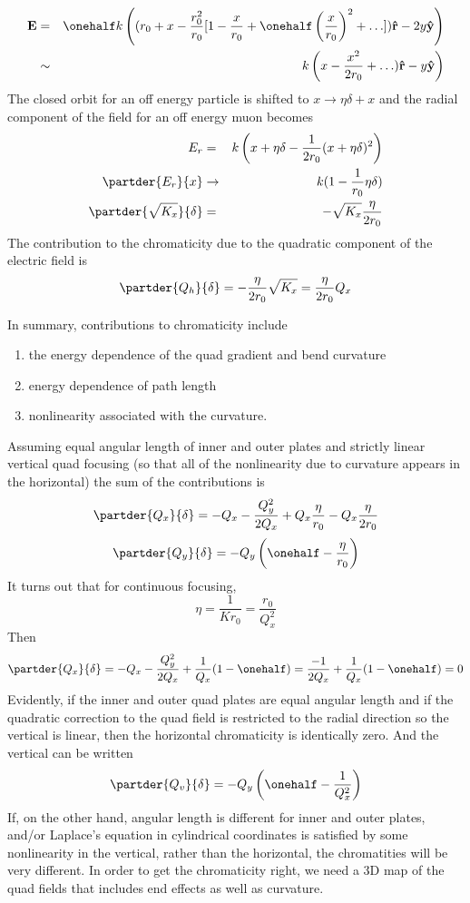 \begin{enumerate}
\begin{eqnarray*}
{\bf E} &=& \onehalf k\left((r_0+x-\frac{r_0^2}{r_0}[1-\frac{x}{r_0}+\onehalf \left(\frac{x}{r_0}\right)^2+\ldots]){\bf \hat r} -2y{\bf \hat y}\right)\\
 &\sim&  k\left(x- \frac{x^2}{2r_0}+\ldots){\bf \hat r} -y{\bf \hat y}\right)\\
\end{eqnarray*}
The closed orbit for an off energy particle is shifted to $x\rightarrow \eta\delta + x$ and the radial component of the field
for an off energy muon becomes
\begin{eqnarray*}
E_r &=& k\left(x+\eta\delta-\frac{1}{2r_0}(x+\eta\delta)^2\right)\\
\partder{E_r}{x} &\rightarrow&  k(1-\frac{1}{r_0}\eta\delta)\\
\partder{\sqrt{K_x}}{\delta} &=& -\sqrt{K_x}\frac{\eta}{2r_0}
\end{eqnarray*}
The contribution to the chromaticity due to the quadratic component of the electric field is
$$\partder{Q_{h}}{\delta} = -\frac{\eta}{2r_0}\sqrt{K_x} = \frac{\eta}{2r_0}Q_x$$
\end{enumerate}
In summary, contributions to chromaticity include \begin{enumerate}
\item the energy dependence of the quad gradient and bend curvature
\item energy dependence of path length
\item  nonlinearity associated with the curvature.
\end{enumerate}
Assuming equal angular length of inner and outer plates and strictly linear vertical quad focusing (so that all of the nonlinearity due to curvature appears in the horizontal)
the sum of the contributions is
$$\partder{Q_{x}}{\delta} = -Q_{x}-\frac{Q_y^2}{2Q_x} +Q_x\frac{\eta}{r_0} -Q_x\frac{\eta}{2r_0}$$
$$ \partder{Q_y}{\delta}= -Q_{y}\left(\onehalf-\frac{\eta}{r_0}\right)$$
It turns out that for continuous focusing, $$\eta = \frac{1}{Kr_0} = \frac{r_0}{Q_x^2}$$
Then
$$\partder{Q_{x}}{\delta} = -Q_{x}-\frac{Q_y^2}{2Q_x} +\frac{1}{Q_x}(1-\onehalf)=\frac{-1}{2Q_x}+\frac{1}{Q_x}(1-\onehalf)=0$$
Evidently, if the inner and outer quad plates are equal angular length and if the quadratic correction to the quad field
is restricted to the radial direction so the vertical is linear, then the horizontal chromaticity is identically zero.
And the vertical can be written
$$ \partder{Q_v}{\delta}= -Q_{y}\left(\onehalf-\frac{1}{Q_x^2}\right)$$
If, on the other hand, angular length is different for inner and outer plates, and/or Laplace's equation in cylindrical coordinates
is satisfied by some nonlinearity in the vertical, rather than the horizontal, the chromatities will be very different.
In order to get the chromaticity right, we need a 3D map of the quad fields that includes end effects as well as curvature.


